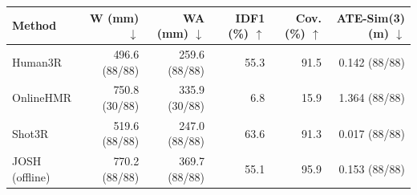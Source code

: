 \begin{tabular}{lrrrrr}
\toprule
Method & W (mm) $\downarrow$ & WA (mm) $\downarrow$ & IDF1 (\%) $\uparrow$ & Cov. (\%) $\uparrow$ & ATE-Sim(3) (m) $\downarrow$ \\
\midrule
Human3R & 496.6 (88/88) & 259.6 (88/88) & 55.3 & 91.5 & 0.142 (88/88) \\
OnlineHMR & 750.8 (30/88) & 335.9 (30/88) & 6.8 & 15.9 & 1.364 (88/88) \\
Shot3R & 519.6 (88/88) & 247.0 (88/88) & 63.6 & 91.3 & 0.017 (88/88) \\
\midrule
JOSH (offline) & 770.2 (88/88) & 369.7 (88/88) & 55.1 & 95.9 & 0.153 (88/88) \\
\bottomrule
\end{tabular}

